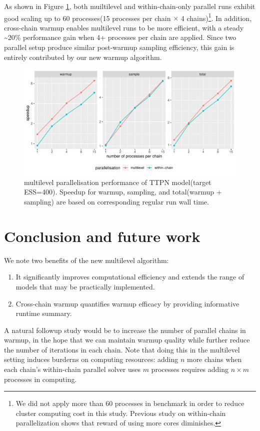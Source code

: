 \documentclass[11pt, reqno, oneside]{amsart}
\begin{document}
As shown in Figure \ref{ttpn_perf}, both muiltilevel and
within-chain-only parallel runs exhibit good scaling up to 60
processes(15 processes per chain \(\times\) 4 chains)\footnote{We did not apply more than 60 processes in benchmark in order
to reduce cluster computing cost in this study. Previous study on within-chain parallelization
\cite{torsten_pmx_group} shows that reward of using more cores
diminishes.}. In
addition, cross-chain warmup enables multilevel runs to be more
efficient, with a steady \textasciitilde{}20\% performance gain when 4+ processes per
chain are applied. Since two parallel setup produce similar
post-warmup sampling efficiency, this gain is entirely contributed by
our new warmup algorithm.

\begin{figure}[htbp]
\centering
\includegraphics[width=\textwidth]{./figure/ttpn2_perf_benchmark.pdf}
\caption{multilevel parallelisation performance of TTPN model(target ESS=400). Speedup for warmup, sampling, and total(warmup + sampling) are based on corresponding regular run wall time. \label{ttpn_perf}}
\end{figure}

\section{Conclusion and future work}
\label{sec:orgdf17708}
We note two benefits of the new multilevel algorithm:
\begin{enumerate}
\item It significantly improves computational efficiency and extends the range of models that may be practically implemented.
\item Cross-chain warmup quantifies warmup efficacy by providing informative runtime summary.
\end{enumerate}

A natural followup study would be to increase the number of parallel
chains in warmup, in the hope that we can maintain warmup quality
while further reduce the number of iterations in each chain. Note that
doing this in the multilevel setting induces burderns on computing
resources: adding \(n\) more chains when each chain's within-chain
parallel solver uses \(m\) processes requires adding \(n\times m\) processes in computing.




\end{document}

